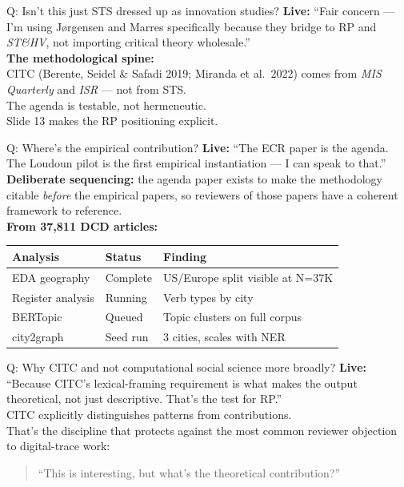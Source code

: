 \documentclass[aspectratio=169,12pt]{beamer}
\begin{document}
\begin{frame}[noframenumbering]{Q: Isn't this just STS dressed up as innovation studies?}
\footnotesize
\textbf{Live:} ``Fair concern — I'm using Jørgensen and Marres specifically
because they bridge to RP and \textit{ST\&HV}, not importing critical theory wholesale.''\\[0.6em]

\textbf{The methodological spine:}\\
CITC (Berente, Seidel \& Safadi 2019; Miranda et al.\ 2022) comes from
\textit{MIS Quarterly} and \textit{ISR} — not from STS.\\[0.6em]

The agenda is testable, not hermeneutic.\\[0.4em]
Slide 13 makes the RP positioning explicit.
\end{frame}

\begin{frame}[noframenumbering]{Q: Where's the empirical contribution?}
\footnotesize
\textbf{Live:} ``The ECR paper is the agenda. The Loudoun pilot is the first
empirical instantiation — I can speak to that.''\\[0.6em]

\textbf{Deliberate sequencing:} the agenda paper exists to make the
methodology citable \textit{before} the empirical papers, so reviewers of
those papers have a coherent framework to reference.\\[0.6em]

\textbf{From 37,811 DCD articles:}\\[0.3em]
\begin{tabular}{@{}lll@{}}
  \toprule
  \textbf{Analysis} & \textbf{Status} & \textbf{Finding} \\
  \midrule
  EDA geography     & Complete  & US/Europe split visible at N=37K \\
  Register analysis & Running   & Verb types by city \\
  BERTopic          & Queued    & Topic clusters on full corpus \\
  city2graph        & Seed run  & 3 cities, scales with NER \\
  \bottomrule
\end{tabular}
\end{frame}

\begin{frame}[noframenumbering]{Q: Why CITC and not computational social science more broadly?}
\footnotesize
\textbf{Live:} ``Because CITC's lexical-framing requirement is what makes
the output theoretical, not just descriptive. That's the test for RP.''\\[0.6em]

CITC explicitly distinguishes patterns from contributions.\\[0.4em]
That's the discipline that protects against the most common reviewer
objection to digital-trace work:\\[0.4em]
\begin{quote}
  ``This is interesting, but what's the theoretical contribution?''
\end{quote}
\end{frame}
\end{document}
